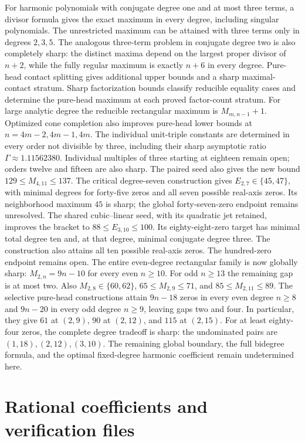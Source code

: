 \documentclass[UTF8,11pt]{ctexart}
\theoremstyle{definition}
\numberwithin{equation}{section}
\begin{document}
\begin{tcolorbox}[breakable,colback=MidnightBlue!4,colframe=MidnightBlue!50,sharp corners,boxrule=.5pt]
For harmonic polynomials with conjugate degree one and at most
three terms, a divisor formula gives the exact maximum in every
degree, including singular polynomials. The unrestricted maximum
can be attained with three terms only in degrees $2,3,5$.
The analogous three-term problem in conjugate degree two is
also completely sharp: the distinct maxima depend on the largest
proper divisor of $n+2$, while the fully regular maximum is
exactly $n+6$ in every degree. Pure-head contact splitting gives
additional upper bounds and a sharp maximal-contact stratum.
Sharp factorization bounds classify reducible equality cases and
determine the pure-head maximum at each proved factor-count stratum.
For large analytic degree the reducible rectangular maximum is
$M_{m,n-1}+1$. Optimized cone completion also improves pure-head
lower bounds at $n=4m-2,4m-1,4m$.
The individual unit-triple constants are determined in every order
not divisible by three, including their sharp asymptotic ratio
$\Gamma\approx1.11562380$. Individual multiples of three starting
at eighteen remain open; orders twelve and fifteen are also sharp.
The paired seed also gives the new bound $129\le M_{4,11}\le137$.
The critical degree-seven construction gives $E_{2,7}\in\{45,47\}$,
with minimal degrees for forty-five zeros and all seven possible
real-axis zeros. Its neighborhood maximum $45$ is sharp;
the global forty-seven-zero endpoint remains unresolved.
The shared cubic--linear seed, with its quadratic jet retained,
improves the bracket to $88\le E_{3,10}\le100$. Its eighty-eight-zero
target has minimal total degree ten and, at that degree, minimal
conjugate degree three. The construction also attains all ten
possible real-axis zeros. The hundred-zero endpoint remains open.
The entire even-degree rectangular family is now globally sharp:
$M_{2,n}=9n-10$ for every even $n\ge10$.
For odd $n\ge13$ the remaining gap is at most two.
Also $M_{2,8}\in\{60,62\}$, $65\le M_{2,9}\le71$,
and $85\le M_{2,11}\le89$.
The selective pure-head constructions attain $9n-18$ zeros
in every even degree $n\ge8$ and $9n-20$ in every odd
degree $n\ge9$, leaving gaps two and four. In particular,
they give $61$ at $(2,9)$, $90$ at $(2,12)$, and $115$ at $(2,15)$.
For at least eighty-four zeros, the complete degree tradeoff
is sharp: the undominated pairs are $(1,18),(2,12),(3,10)$.
The remaining global boundary,
the full bidegree formula,
and the optimal fixed-degree harmonic coefficient remain
undetermined here.
\end{tcolorbox}

\appendix
\section{Rational coefficients and verification files}\label{b:app:coefficients}
\end{document}
